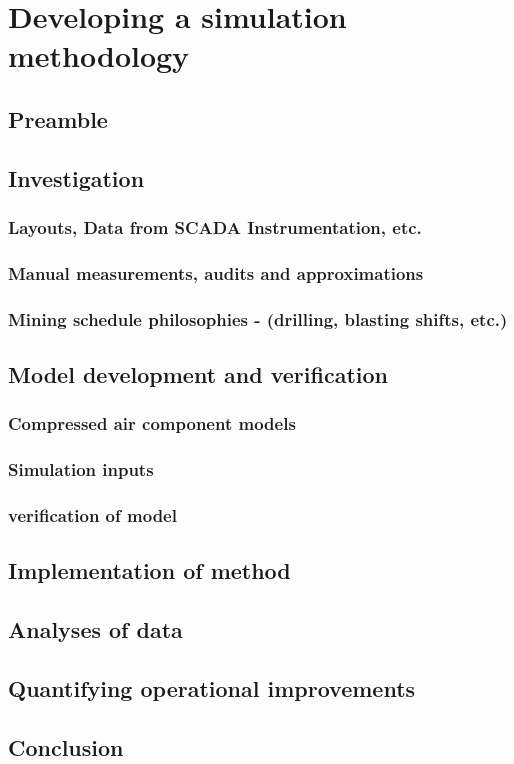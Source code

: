 \chapter{Developing a simulation methodology}
\section{Preamble}
\section{Investigation}
	\subsection{Layouts, Data from SCADA Instrumentation, etc.}
	\subsection{Manual measurements, audits and approximations}
	\subsection{Mining schedule philosophies \color{blue} - (drilling, blasting shifts, etc.)}
\section{Model development and verification}
	\subsection{Compressed air component models}
	\subsection{Simulation inputs}
	\subsection{verification of model}
\section{Implementation of method}
\section{Analyses of data}
\section{Quantifying operational improvements}
\section{Conclusion}